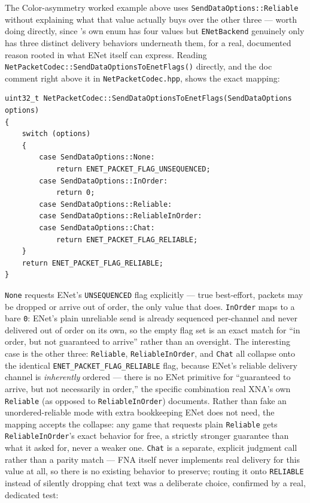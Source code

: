 The Color-asymmetry worked example above uses \texttt{SendDataOptions::Reliable} without
explaining what that value actually buys over the other three --- worth doing directly, since
's own  enum has four values but
\texttt{ENetBackend} genuinely only has three distinct delivery behaviors underneath them, for a
real, documented reason rooted in what ENet itself can express. Reading
\texttt{NetPacketCodec::SendDataOptionsToEnetFlags()} directly, and the doc comment right above
it in \texttt{NetPacketCodec.hpp}, shows the exact mapping:

\begin{lstlisting}
uint32_t NetPacketCodec::SendDataOptionsToEnetFlags(SendDataOptions options)
{
    switch (options)
    {
        case SendDataOptions::None:
            return ENET_PACKET_FLAG_UNSEQUENCED;
        case SendDataOptions::InOrder:
            return 0;
        case SendDataOptions::Reliable:
        case SendDataOptions::ReliableInOrder:
        case SendDataOptions::Chat:
            return ENET_PACKET_FLAG_RELIABLE;
    }
    return ENET_PACKET_FLAG_RELIABLE;
}
\end{lstlisting}

\texttt{None} requests ENet's \texttt{UNSEQUENCED} flag explicitly --- true best-effort, packets
may be dropped or arrive out of order, the only  value that does.
\texttt{InOrder} maps to a bare \texttt{0}: ENet's plain unreliable send is already sequenced
per-channel and never delivered out of order on its own, so the empty flag set is an exact match
for ``in order, but not guaranteed to arrive'' rather than an oversight. The interesting case is
the other three: \texttt{Reliable}, \texttt{ReliableInOrder}, and \texttt{Chat} all collapse onto
the identical \texttt{ENET\_PACKET\_FLAG\_RELIABLE} flag, because ENet's reliable delivery
channel is \emph{inherently} ordered --- there is no ENet primitive for ``guaranteed to arrive,
but not necessarily in order,'' the specific combination real XNA's own \texttt{Reliable} (as
opposed to \texttt{ReliableInOrder}) documents. Rather than fake an unordered-reliable mode with
extra bookkeeping ENet does not need, the mapping accepts the collapse: any game that requests
plain \texttt{Reliable} gets \texttt{ReliableInOrder}'s exact behavior for free, a strictly
stronger guarantee than what it asked for, never a weaker one. \texttt{Chat} is a separate,
explicit judgment call rather than a parity match --- FNA itself never implements real delivery
for this value at all, so there is no existing behavior to preserve; routing it onto
\texttt{RELIABLE} instead of silently dropping chat text was a deliberate choice, confirmed by a
real, dedicated test:

